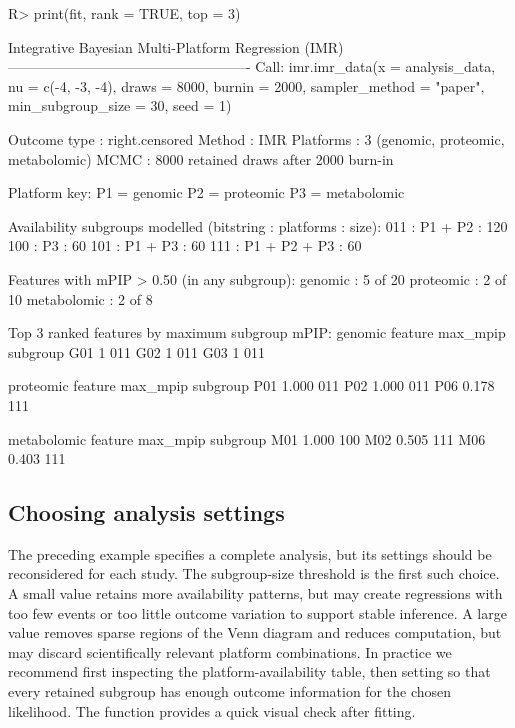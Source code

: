 \documentclass[article]{jss}
\begin{document}
\begin{CodeChunk}
\begin{CodeInput}
R> print(fit, rank = TRUE, top = 3)
\end{CodeInput}
\begin{CodeOutput}
Integrative Bayesian Multi-Platform Regression (IMR)
----------------------------------------------------
Call:
  imr.imr_data(x = analysis_data, nu = c(-4, -3, -4), draws = 8000, 
    burnin = 2000, sampler_method = "paper", min_subgroup_size = 30, 
    seed = 1)

Outcome type : right.censored
Method       : IMR
Platforms    : 3 (genomic, proteomic, metabolomic)
MCMC         : 8000 retained draws after 2000 burn-in

Platform key:
  P1 = genomic
  P2 = proteomic
  P3 = metabolomic

Availability subgroups modelled (bitstring : platforms : size):
  011 : P1 + P2      : 120
  100 : P3           : 60
  101 : P1 + P3      : 60
  111 : P1 + P2 + P3 : 60

Features with mPIP > 0.50 (in any subgroup):
  genomic      : 5 of 20
  proteomic    : 2 of 10
  metabolomic  : 2 of 8

Top 3 ranked features by maximum subgroup mPIP:
  genomic
     feature max_mpip subgroup
         G01        1      011
         G02        1      011
         G03        1      011

  proteomic
     feature max_mpip subgroup
         P01    1.000      011
         P02    1.000      011
         P06    0.178      111

  metabolomic
     feature max_mpip subgroup
         M01    1.000      100
         M02    0.505      111
         M06    0.403      111

\end{CodeOutput}
\end{CodeChunk}

\subsection{Choosing analysis settings}\label{sec:settings}

The preceding example specifies a complete analysis, but its settings should
be reconsidered for each study.  The subgroup-size threshold  is the first such choice.  A
small value retains more availability patterns, but may create regressions with
too few events or too little outcome variation to support stable inference.  A
large value removes sparse regions of the Venn diagram and reduces computation,
but may discard scientifically relevant platform combinations.  In practice we
recommend first inspecting the platform-availability table, then setting
 so that every retained subgroup has enough outcome information for
the chosen likelihood.  The function  provides a
quick visual check after fitting.
\end{document}
